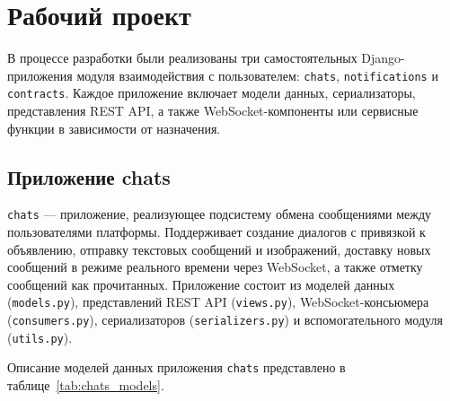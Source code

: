 \section{Рабочий проект}

В процессе разработки были реализованы три самостоятельных Django-приложения модуля взаимодействия с пользователем: \texttt{chats}, \texttt{notifications} и \texttt{contracts}. Каждое приложение включает модели данных, сериализаторы, представления REST API, а также WebSocket-компоненты или сервисные функции в зависимости от назначения.

\subsection{Приложение chats}

\texttt{chats} --- приложение, реализующее подсистему обмена сообщениями между пользователями платформы. Поддерживает создание диалогов с привязкой к объявлению, отправку текстовых сообщений и изображений, доставку новых сообщений в режиме реального времени через WebSocket, а также отметку сообщений как прочитанных. Приложение состоит из моделей данных (\texttt{models.py}), представлений REST API (\texttt{views.py}), WebSocket-консьюмера (\texttt{consumers.py}), сериализаторов (\texttt{serializers.py}) и вспомогательного модуля (\texttt{utils.py}).

Описание моделей данных приложения \texttt{chats} представлено в таблице~\ref{tab:chats_models}.

